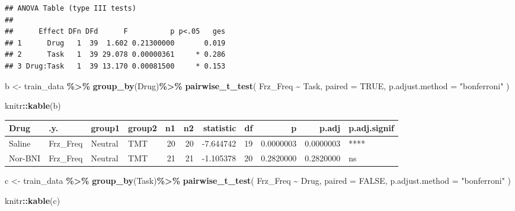 \documentclass[
]{book}
\newenvironment{Shaded}{\begin{snugshade}}{\end{snugshade}}
\newcommand{\AttributeTok}[1]{\textcolor[rgb]{0.13,0.29,0.53}{#1}}
\newcommand{\ConstantTok}[1]{\textcolor[rgb]{0.56,0.35,0.01}{#1}}
\newcommand{\FunctionTok}[1]{\textcolor[rgb]{0.13,0.29,0.53}{\textbf{#1}}}
\newcommand{\NormalTok}[1]{#1}
\newcommand{\OtherTok}[1]{\textcolor[rgb]{0.56,0.35,0.01}{#1}}
\newcommand{\SpecialCharTok}[1]{\textcolor[rgb]{0.81,0.36,0.00}{\textbf{#1}}}
\newcommand{\StringTok}[1]{\textcolor[rgb]{0.31,0.60,0.02}{#1}}
\begin{document}
\begin{verbatim}
## ANOVA Table (type III tests)
## 
##      Effect DFn DFd      F          p p<.05   ges
## 1      Drug   1  39  1.602 0.21300000       0.019
## 2      Task   1  39 29.078 0.00000361     * 0.286
## 3 Drug:Task   1  39 13.170 0.00081500     * 0.153
\end{verbatim}

\begin{Shaded}
\begin{Highlighting}[]
\NormalTok{b }\OtherTok{\textless{}{-}}\NormalTok{ train\_data }\SpecialCharTok{\%\textgreater{}\%}
  \FunctionTok{group\_by}\NormalTok{(Drug)}\SpecialCharTok{\%\textgreater{}\%}
  \FunctionTok{pairwise\_t\_test}\NormalTok{(}
\NormalTok{  Frz\_Freq }\SpecialCharTok{\textasciitilde{}}\NormalTok{ Task, }\AttributeTok{paired =} \ConstantTok{TRUE}\NormalTok{,}
  \AttributeTok{p.adjust.method =} \StringTok{"bonferroni"}
\NormalTok{  )}

\NormalTok{knitr}\SpecialCharTok{::}\FunctionTok{kable}\NormalTok{(b)}
\end{Highlighting}
\end{Shaded}

\begin{tabular}{l|l|l|l|r|r|r|r|r|r|l}
\hline
Drug & .y. & group1 & group2 & n1 & n2 & statistic & df & p & p.adj & p.adj.signif\\
\hline
Saline & Frz\_Freq & Neutral & TMT & 20 & 20 & -7.644742 & 19 & 0.0000003 & 0.0000003 & ****\\
\hline
Nor-BNI & Frz\_Freq & Neutral & TMT & 21 & 21 & -1.105378 & 20 & 0.2820000 & 0.2820000 & ns\\
\hline
\end{tabular}

\begin{Shaded}
\begin{Highlighting}[]
\NormalTok{c }\OtherTok{\textless{}{-}}\NormalTok{ train\_data }\SpecialCharTok{\%\textgreater{}\%}
  \FunctionTok{group\_by}\NormalTok{(Task)}\SpecialCharTok{\%\textgreater{}\%}
  \FunctionTok{pairwise\_t\_test}\NormalTok{(}
\NormalTok{  Frz\_Freq }\SpecialCharTok{\textasciitilde{}}\NormalTok{ Drug, }\AttributeTok{paired =} \ConstantTok{FALSE}\NormalTok{,}
  \AttributeTok{p.adjust.method =} \StringTok{"bonferroni"}
\NormalTok{  )}

\NormalTok{knitr}\SpecialCharTok{::}\FunctionTok{kable}\NormalTok{(c)}
\end{Highlighting}
\end{Shaded}
\end{document}

